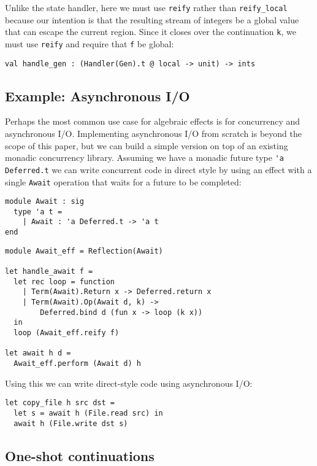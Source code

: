 \documentclass[acmsmall, screen, nonacm]{acmart}
\theoremstyle{definition}
\begin{document}
Unlike the state handler, here we must use
\lstinline[style=ocaml]{reify} rather than
\lstinline[style=ocaml]{reify_local} because our intention is that the
resulting stream of integers be a global value that can escape the
current region. Since it closes over the continuation
\lstinline[style=ocaml]{k}, we must use \lstinline[style=ocaml]{reify}
and require that \lstinline[style=ocaml]{f} be global:
\begin{lstlisting}[style=ocaml]
val handle_gen : (Handler(Gen).t @ local -> unit) -> ints
\end{lstlisting}

\subsection{Example: Asynchronous I/O}

Perhaps the most common use case for algebraic effects is for
concurrency and asynchronous I/O. Implementing asynchronous I/O from
scratch is beyond the scope of this paper, but we can build a simple
version on top of an existing monadic concurrency library. Assuming we
have a monadic future type \lstinline[style=ocaml]{'a Deferred.t} we can
write concurrent code in direct style by using an effect with a single
\lstinline[style=ocaml]{Await} operation that waits for a future to be
completed:
\begin{lstlisting}[style=ocaml]
module Await : sig
  type 'a t =
    | Await : 'a Deferred.t -> 'a t
end
\end{lstlisting}

\begin{lstlisting}[style=ocaml]
module Await_eff = Reflection(Await)

let handle_await f =
  let rec loop = function
    | Term(Await).Return x -> Deferred.return x
    | Term(Await).Op(Await d, k) ->
        Deferred.bind d (fun x -> loop (k x))
  in
  loop (Await_eff.reify f)

let await h d =
  Await_eff.perform (Await d) h
\end{lstlisting}

Using this we can write direct-style code using asynchronous I/O:
\begin{lstlisting}[style=ocaml]
let copy_file h src dst =
  let s = await h (File.read src) in
  await h (File.write dst s)
\end{lstlisting}

\subsection{One-shot continuations}
\end{document}
